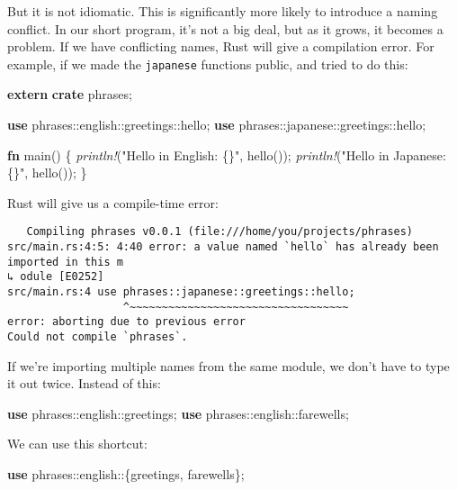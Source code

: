 \documentclass[a4paper,]{book}
\newenvironment{Shaded}{\begin{snugshade}}{\end{snugshade}}
\newcommand{\KeywordTok}[1]{\textcolor[rgb]{0.13,0.29,0.53}{\textbf{{#1}}}}
\newcommand{\StringTok}[1]{\textcolor[rgb]{0.31,0.60,0.02}{{#1}}}
\newcommand{\PreprocessorTok}[1]{\textcolor[rgb]{0.56,0.35,0.01}{\textit{{#1}}}}
\newcommand{\NormalTok}[1]{{#1}}
\begin{document}
But it is not idiomatic. This is significantly more likely to introduce
a naming conflict. In our short program, it's not a big deal, but as it
grows, it becomes a problem. If we have conflicting names, Rust will
give a compilation error. For example, if we made the \texttt{japanese}
functions public, and tried to do this:

\begin{Shaded}
\begin{Highlighting}[]
\KeywordTok{extern} \KeywordTok{crate} \NormalTok{phrases;}

\KeywordTok{use} \NormalTok{phrases::english::greetings::hello;}
\KeywordTok{use} \NormalTok{phrases::japanese::greetings::hello;}

\KeywordTok{fn} \NormalTok{main() \{}
    \PreprocessorTok{println!}\NormalTok{(}\StringTok{"Hello in English: \{\}"}\NormalTok{, hello());}
    \PreprocessorTok{println!}\NormalTok{(}\StringTok{"Hello in Japanese: \{\}"}\NormalTok{, hello());}
\NormalTok{\}}
\end{Highlighting}
\end{Shaded}

Rust will give us a compile-time error:

\begin{verbatim}
   Compiling phrases v0.0.1 (file:///home/you/projects/phrases)
src/main.rs:4:5: 4:40 error: a value named `hello` has already been imported in this m
↳ odule [E0252]
src/main.rs:4 use phrases::japanese::greetings::hello;
                  ^~~~~~~~~~~~~~~~~~~~~~~~~~~~~~~~~~~
error: aborting due to previous error
Could not compile `phrases`.
\end{verbatim}

If we're importing multiple names from the same module, we don't have to
type it out twice. Instead of this:

\begin{Shaded}
\begin{Highlighting}[]
\KeywordTok{use} \NormalTok{phrases::english::greetings;}
\KeywordTok{use} \NormalTok{phrases::english::farewells;}
\end{Highlighting}
\end{Shaded}

We can use this shortcut:

\begin{Shaded}
\begin{Highlighting}[]
\KeywordTok{use} \NormalTok{phrases::english::\{greetings, farewells\};}
\end{Highlighting}
\end{Shaded}
\end{document}
